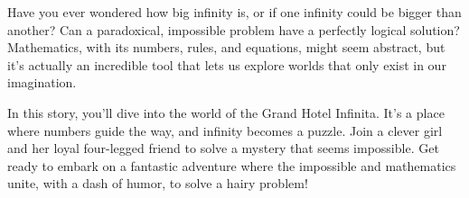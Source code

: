 Have you ever wondered how big infinity is, or if one infinity could be bigger than another? Can a paradoxical, impossible problem have a perfectly logical solution? Mathematics, with its numbers, rules, and equations, might seem abstract, but it's actually an incredible tool that lets us explore worlds that only exist in our imagination.

In this story, you'll dive into the world of the Grand Hotel Infinita. It's a place where numbers guide the way, and infinity becomes a puzzle. Join a clever girl and her loyal four-legged friend to solve a mystery that seems impossible. Get ready to embark on a fantastic adventure where the impossible and mathematics unite, with a dash of humor, to solve a hairy problem!
